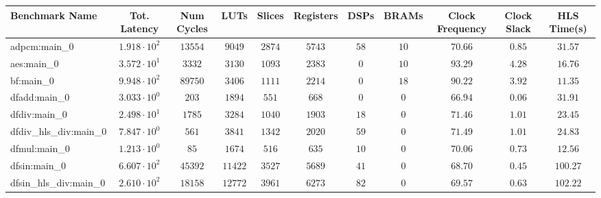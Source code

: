 \begin{tabular}{|l|c|c|c|c|c|c|c|c|c|c|}
\hline
Benchmark Name          & Tot. Latency           & Num Cycles & LUTs      & Slices    & Registers & DSPs    & BRAMs   & Clock Frequency & Clock Slack & HLS Time(s) \\
\hline
adpcm:main\_0           & $ 1.918 \cdot 10^{2} $ & $ 13554  $ & $ 9049  $ & $ 2874  $ & $ 5743  $ & $ 58  $ & $ 10  $ & $ 70.66       $ & $ 0.85    $ & $ 31.57   $ \\
aes:main\_0             & $ 3.572 \cdot 10^{1} $ & $ 3332   $ & $ 3130  $ & $ 1093  $ & $ 2383  $ & $ 0   $ & $ 10  $ & $ 93.29       $ & $ 4.28    $ & $ 16.76   $ \\
bf:main\_0              & $ 9.948 \cdot 10^{2} $ & $ 89750  $ & $ 3406  $ & $ 1111  $ & $ 2214  $ & $ 0   $ & $ 18  $ & $ 90.22       $ & $ 3.92    $ & $ 11.35   $ \\
dfadd:main\_0           & $ 3.033 \cdot 10^{0} $ & $ 203    $ & $ 1894  $ & $ 551   $ & $ 668   $ & $ 0   $ & $ 0   $ & $ 66.94       $ & $ 0.06    $ & $ 31.91   $ \\
dfdiv:main\_0           & $ 2.498 \cdot 10^{1} $ & $ 1785   $ & $ 3284  $ & $ 1040  $ & $ 1903  $ & $ 18  $ & $ 0   $ & $ 71.46       $ & $ 1.01    $ & $ 23.45   $ \\
dfdiv\_hls\_div:main\_0 & $ 7.847 \cdot 10^{0} $ & $ 561    $ & $ 3841  $ & $ 1342  $ & $ 2020  $ & $ 59  $ & $ 0   $ & $ 71.49       $ & $ 1.01    $ & $ 24.83   $ \\
dfmul:main\_0           & $ 1.213 \cdot 10^{0} $ & $ 85     $ & $ 1674  $ & $ 516   $ & $ 635   $ & $ 10  $ & $ 0   $ & $ 70.06       $ & $ 0.73    $ & $ 12.56   $ \\
dfsin:main\_0           & $ 6.607 \cdot 10^{2} $ & $ 45392  $ & $ 11422 $ & $ 3527  $ & $ 5689  $ & $ 41  $ & $ 0   $ & $ 68.70       $ & $ 0.45    $ & $ 100.27  $ \\
dfsin\_hls\_div:main\_0 & $ 2.610 \cdot 10^{2} $ & $ 18158  $ & $ 12772 $ & $ 3961  $ & $ 6273  $ & $ 82  $ & $ 0   $ & $ 69.57       $ & $ 0.63    $ & $ 102.22  $ \\

\end{tabular}
